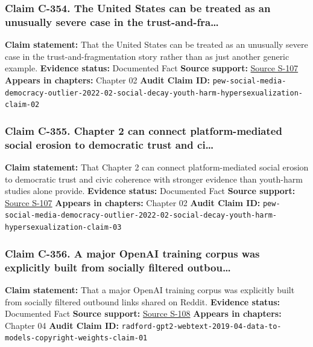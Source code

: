 \documentclass[
  american,
  11pt,
  letterpaper,
]{article}
\begin{document}
\subsubsection{Claim C-354. The United States can be treated as an
unusually severe case in the
trust-and-fra\ldots{}}\label{claim-c-354-the-united-states-can-be-treated-as-an-unusually-severe-case-in-the-trust-and-fra}

\textbf{Claim statement:} That the United States can be treated as an
unusually severe case in the trust-and-fragmentation story rather than
as just another generic example. \textbf{Evidence status:} Documented
Fact \textbf{Source support:}
\hyperref[source-s-107-social-media-seen-as-mostly-good-for-democracy-across-many-nations-but-u-s-is-a-major-outlier]{Source
S-107} \textbf{Appears in chapters:} Chapter 02 \textbf{Audit Claim ID:}
\texttt{pew-social-media-democracy-outlier-2022-02-social-decay-youth-harm-hypersexualization-claim-02}

\subsubsection{Claim C-355. Chapter 2 can connect platform-mediated
social erosion to democratic trust and
ci\ldots{}}\label{claim-c-355-chapter-2-can-connect-platform-mediated-social-erosion-to-democratic-trust-and-ci}

\textbf{Claim statement:} That Chapter 2 can connect platform-mediated
social erosion to democratic trust and civic coherence with stronger
evidence than youth-harm studies alone provide. \textbf{Evidence
status:} Documented Fact \textbf{Source support:}
\hyperref[source-s-107-social-media-seen-as-mostly-good-for-democracy-across-many-nations-but-u-s-is-a-major-outlier]{Source
S-107} \textbf{Appears in chapters:} Chapter 02 \textbf{Audit Claim ID:}
\texttt{pew-social-media-democracy-outlier-2022-02-social-decay-youth-harm-hypersexualization-claim-03}

\subsubsection{Claim C-356. A major OpenAI training corpus was
explicitly built from socially filtered
outbou\ldots{}}\label{claim-c-356-a-major-openai-training-corpus-was-explicitly-built-from-socially-filtered-outbou}

\textbf{Claim statement:} That a major OpenAI training corpus was
explicitly built from socially filtered outbound links shared on Reddit.
\textbf{Evidence status:} Documented Fact \textbf{Source support:}
\hyperref[source-s-108-language-models-are-unsupervised-multitask-learners]{Source
S-108} \textbf{Appears in chapters:} Chapter 04 \textbf{Audit Claim ID:}
\texttt{radford-gpt2-webtext-2019-04-data-to-models-copyright-weights-claim-01}
\end{document}
